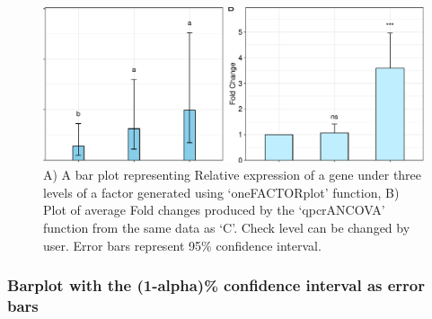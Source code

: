 \documentclass[
]{article}
\begin{document}
\begin{figure}

{\centering \includegraphics{vignette_files/figure-latex/unnamed-chunk-11-1} 

}

\caption{A) A bar plot representing Relative expression of a gene under three levels of a factor generated using ‘oneFACTORplot’ function, B) Plot of average Fold changes produced by the ‘qpcrANCOVA’ function from the same data as ‘C’. Check level can be changed by user. Error bars represent 95\% confidence interval.}\label{fig:unnamed-chunk-11}
\end{figure}

\hypertarget{barplot-with-the-1-alpha-confidence-interval-as-error-bars}{%
\subsubsection{Barplot with the (1-alpha)\% confidence interval as error
bars}\label{barplot-with-the-1-alpha-confidence-interval-as-error-bars}}
\end{document}
